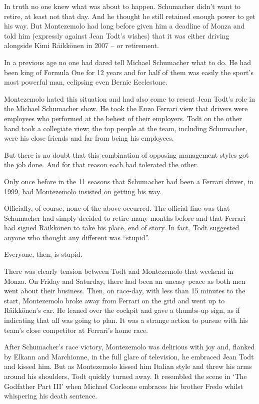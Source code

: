 \documentclass{article}
\begin{document}
In truth no one knew what was about to happen. Schumacher didn’t want to retire, at least not that day. And he thought he still retained enough power to get his way. But Montezemolo had long before given him a deadline of Monza and told him (expressly against Jean Todt’s wishes) that it was either driving alongside Kimi Räikkönen in 2007 – or retirement.

In a previous age no one had dared tell Michael Schumacher what to do. He had been king of Formula One for 12 years and for half of them was easily the sport’s most powerful man, eclipsing even Bernie Ecclestone.

Montezemolo hated this situation and had also come to resent Jean Todt’s role in the Michael Schumacher show. He took the Enzo Ferrari view that drivers were employees who performed at the behest of their employers. Todt on the other hand took a collegiate view; the top people at the team, including Schumacher, were his close friends and far from being his employees.

But there is no doubt that this combination of opposing management styles got the job done. And for that reason each had tolerated the other.

Only once before in the 11 seasons that Schumacher had been a Ferrari driver, in 1999, had Montezemolo insisted on getting his way.

Officially, of course, none of the above occurred. The official line was that Schumacher had simply decided to retire many months before and that Ferrari had signed Räikkönen to take his place, end of story. In fact, Todt suggested anyone who thought any different was “stupid”.

Everyone, then, is stupid.

There was clearly tension between Todt and Montezemolo that weekend in Monza. On Friday and Saturday, there had been an uneasy peace as both men went about their business. Then, on race-day, with less than 15 minutes to the start, Montezemolo broke away from Ferrari on the grid and went up to Räikkönen’s car. He leaned over the cockpit and gave a thumbs-up sign, as if indicating that all was going to plan. It was a strange action to pursue with his team’s close competitor at Ferrari’s home race.

After Schumacher’s race victory, Montezemolo was delirious with joy and, flanked by Elkann and Marchionne, in the full glare of television, he embraced Jean Todt and kissed him. But as Montezemolo kissed him Italian style and threw his arms around his shoulders, Todt quickly turned away. It resembled the scene in ‘The Godfather Part III’ when Michael Corleone embraces his brother Fredo whilst whispering his death sentence.
\end{document}
